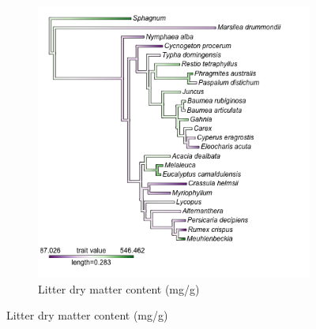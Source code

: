 \documentclass{article}
\begin{document}
\begin{figure}
\begin{subfigure}[h]{0.7\textwidth}
		\includegraphics[width=\linewidth]{figs/phylo_DMC.png}
		\caption{Litter dry matter content (mg/g)}
		\label{Fig:phyDMC}
	\end{subfigure}
\end{figure}
\end{document}
